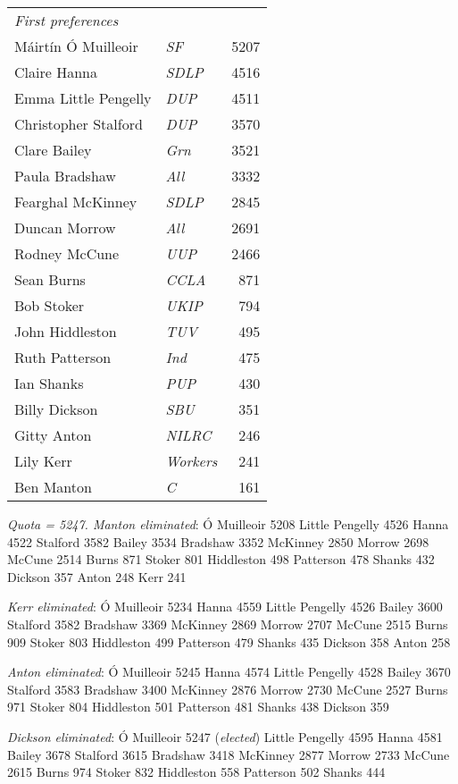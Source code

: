 \begin{resultsiii}
\noindent
\begin{tabular*}{\columnwidth}{@{\extracolsep{\fill}} p{} >{\itshape}l r @{\extracolsep{\fill}}}
	\emph{First preferences}\\
	Máirtín Ó Muilleoir & SF & 5207\\
	Claire Hanna & SDLP & 4516\\
	Emma Little Pengelly & DUP & 4511\\
	Christopher Stalford & DUP & 3570\\
	Clare Bailey & Grn & 3521\\
	Paula Bradshaw & All & 3332\\
	Fearghal McKinney & SDLP & 2845\\
	Duncan Morrow & All & 2691\\
	Rodney McCune & UUP & 2466\\
	Sean Burns & CCLA & 871\\
	Bob Stoker & UKIP & 794\\
	John Hiddleston & TUV & 495\\
	Ruth Patterson & Ind & 475\\
	Ian Shanks & PUP & 430\\
	Billy Dickson & SBU & 351\\
	Gitty Anton & NILRC & 246\\
	Lily Kerr & Workers & 241\\
	Ben Manton & C & 161\\
\end{tabular*}

\emph{Quota = 5247.  Manton eliminated}: Ó Muilleoir 5208 Little Pengelly 4526 Hanna 4522 Stalford 3582 Bailey 3534 Bradshaw 3352 McKinney 2850 Morrow 2698 McCune 2514 Burns 871 Stoker 801 Hiddleston 498 Patterson 478 Shanks 432 Dickson 357 Anton 248 Kerr 241

\emph{Kerr eliminated}: Ó Muilleoir 5234 Hanna 4559 Little Pengelly 4526 Bailey 3600 Stalford 3582 Bradshaw 3369 McKinney 2869 Morrow 2707 McCune 2515 Burns 909 Stoker 803 Hiddleston 499 Patterson 479 Shanks 435 Dickson 358 Anton 258

\emph{Anton eliminated}: Ó Muilleoir 5245 Hanna 4574 Little Pengelly 4528 Bailey 3670 Stalford 3583 Bradshaw 3400 McKinney 2876 Morrow 2730 McCune 2527 Burns 971 Stoker 804 Hiddleston 501 Patterson 481 Shanks 438 Dickson 359

\emph{Dickson eliminated}: Ó Muilleoir 5247 (\emph{elected}) Little Pengelly 4595 Hanna 4581 Bailey 3678 Stalford 3615 Bradshaw 3418 McKinney 2877 Morrow 2733 McCune 2615 Burns 974 Stoker 832 Hiddleston 558 Patterson 502 Shanks 444


\end{resultsiii}
